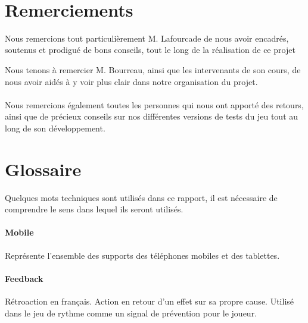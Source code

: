 \documentclass [a4 paper,11pt]{report}
\begin{document}
\newcommand{\HRule}{\rule{\linewidth}{0.5mm}}

\pagestyle{fancy}
\renewcommand\headrulewidth{1pt}
\fancyhead[L]{}
\fancyhead[R]{\leftmark}



\newpage 
~
\thispagestyle{empty}

\newpage

\thispagestyle{empty}
\section*{Remerciements}

Nous remercions tout particulièrement M. Lafourcade de nous avoir encadrés, soutenus et prodigué de bons conseils, tout le long de la réalisation de ce projet

Nous tenons à remercier M. Bourreau, ainsi que les intervenants de son cours, de nous avoir aidés à y voir plus clair dans notre organisation du projet.

\paragraph{}
Nous remercions également toutes les personnes qui nous ont apporté des retours, ainsi que de précieux conseils sur nos différentes versions de tests du jeu tout au long de son développement.


\newpage

\setcounter{page}{1}
\tableofcontents

\newpage

\listoffigures

\newpage 



\newpage

\section*{Glossaire}

Quelques mots techniques sont utilisés dans ce rapport, il est nécessaire de comprendre le sens dans lequel ils seront utilisés.

\paragraph{Mobile} Représente l'ensemble des supports des téléphones mobiles et des tablettes.

\paragraph{Feedback} Rétroaction en français. Action en retour d’un effet sur sa propre cause. Utilisé dans le jeu de rythme comme un signal de prévention pour le joueur.
\end{document}
